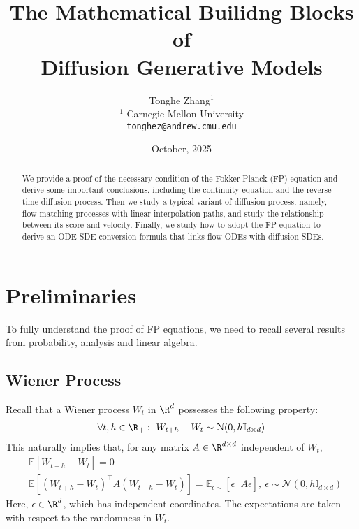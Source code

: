 \documentclass{article}
\title{
The Mathematical Builidng Blocks of 
\protect 
\\
Diffusion Generative Models
}
\author{
    Tonghe Zhang$^1$\quad
    \\
    $^{1}$ Carnegie Mellon University\\
    \texttt{tonghez@andrew.cmu.edu}
}
\date{October, 2025}
\begin{document}
\maketitle

\renewcommand{\thefootnote}{\fnsymbol{footnote}}
\renewcommand*{\thefootnote}{\arabic{footnote}}


\tableofcontents



\begin{abstract}
We provide a proof of the necessary condition of the Fokker-Planck (FP) equation and derive some important conclusions, including the continuity equation and the reverse-time diffusion process. Then we study a typical variant of diffusion process, namely, flow matching processes with linear interpolation paths, and study the relationship between its score and velocity. Finally, we study how to adopt the FP equation to derive an ODE-SDE conversion formula that links flow ODEs with diffusion SDEs. 
\end{abstract}


\section{Preliminaries}
To fully understand the proof of FP equations, we need to recall several results from probability, analysis and linear algebra. 
\subsection{Wiener Process}
\noindent 
Recall that a Wiener process $W_t$ in $\R^d$ possesses the following property:
\begin{equation}
\begin{aligned}
\forall t, h\in \R_+: \ W_{t+h}-W_t \sim \mathcal{N}(0, h\mathbb{I}_{d\times d})
\end{aligned}
\end{equation}
This naturally implies that, for any matrix $A\in \R^{d\times d}$ independent of $W_t$, 
\begin{equation}
\begin{aligned}\label{eq:wiener_quadratic}
&\mathbb{E}\left[W_{t+h}-W_t\right]=0 \\
&\mathbb{E}\left[(W_{t+h}-W_t)^\top A (W_{t+h}-W_t)\right]
=\mathbb{E}_{\epsilon\sim}\left[\epsilon^\top A \epsilon \right], \ \epsilon \sim \mathcal{N}(0, h\mathbb{I}_{d\times d})
\end{aligned}
\end{equation}
Here, $\epsilon \in \R^d$, which has independent coordinates. The expectations are taken with respect to the randomness in $W_t$. 
\end{document}
